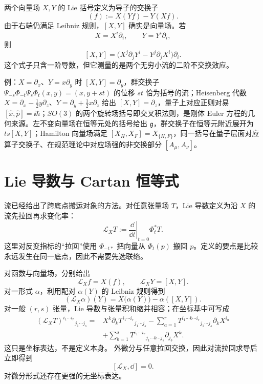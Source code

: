 两个向量场 $X,Y$ 的 Lie 括号定义为导子的交换子
\begin{equation*}[X,Y](f):=X(Yf)-Y(Xf).
\end{equation*}
由于右端仍满足 Leibniz 规则，$[X,Y]$ 确实是向量场。若
\[
X=X^i\partial_i,
\qquad
Y=Y^i\partial_i,
\]
则
\[
[X,Y]
=\bigl(X^j\partial_jY^i-Y^j\partial_jX^i\bigr)\partial_i.
\]
这个式子只含一阶导数，但它测量的是两个无穷小流的二阶不交换效应。

例：$X=\partial_x$、$Y=x\partial_y$ 时 $[X,Y]=\partial_y$，群交换子 $\Psi_{-s}\Phi_{-t}\Psi_s\Phi_t(x,y)=(x,y+st)$ 的位移 $st$ 恰为括号的流；Heisenberg 代数 $X=\partial_x-\frac12y\partial_z$、$Y=\partial_y+\frac12x\partial_z$ 给出 $[X,Y]=\partial_z$，量子上对应正则对易 $[\hat x,\hat p]=\ii\hbar$；$SO(3)$ 的两个旋转场括号即交叉积法则，是刚体 Euler 方程的几何来源。左不变向量场在恒等元处的括号给出 $\mathfrak g$，群交换子在恒等元附近展开为 $ts[X,Y]$；Hamilton 向量场满足 $[X_H,X_F]=X_{\{H,F\}}$，同一括号在量子层面对应算子交换子、在规范理论中对应场强的非交换部分 $[A_\mu,A_\nu]$。

\section{Lie 导数与 Cartan 恒等式}
流已经给出了跨底点搬运对象的方法。对任意张量场 $T$，Lie 导数定义为沿 $X$ 的流先拉回再求变化率：
\begin{equation}\label{eq:math-dg-synthesis-lie-flow}
\mathcal L_XT
:=\left.\frac{\dd}{\dd t}\right|_{t=0}\Phi_t^*T.
\end{equation}
这里对反变指标的“拉回”使用 $\Phi_{-t*}$ 把向量从 $\Phi_t(p)$ 搬回 $p$。定义的要点是比较永远发生在同一底点，因此不需要先选联络。

对函数与向量场，分别给出
\begin{equation*}\mathcal L_Xf=X(f),
\qquad
\mathcal L_XY=[X,Y].
\end{equation*}
对一形式 $\alpha$，利用配对 $\alpha(Y)$ 的 Leibniz 规则得到
\[
(\mathcal L_X\alpha)(Y)
=X\bigl(\alpha(Y)\bigr)-\alpha([X,Y]).
\]
对一般 $(r,s)$ 张量，Lie 导数与张量积和缩并相容；在坐标基中可写成
\begin{align*}
(\mathcal L_XT)^{i_1\cdots i_r}{}_{j_1\cdots j_s}
={}&X^k\partial_kT^{i_1\cdots i_r}{}_{j_1\cdots j_s}
-\sum_{a=1}^r
T^{i_1\cdots k\cdots i_r}{}_{j_1\cdots j_s}
\partial_kX^{i_a}\\
&+\sum_{b=1}^s
T^{i_1\cdots i_r}{}_{j_1\cdots k\cdots j_s}
\partial_{j_b}X^k.
\end{align*}
这只是坐标表达，不是定义本身。
外微分与任意拉回交换，因此对流拉回求导后立即得到
\begin{equation}\label{eq:math-dg-synthesis-lie-d-commute}
[\mathcal L_X,\dd]=0.
\end{equation}
对微分形式还存在更强的无坐标表达。

